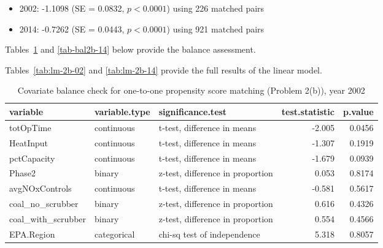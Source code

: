 \documentclass[11pt,letter]{article}
\begin{document}
\begin{enumerate}[(a)]
  \begin{itemize}
  \item 2002: -1.1098 (SE = 0.0832, $p < 0.0001$) using 226 matched
    pairs
  \item 2014: -0.7262 (SE = 0.0443, $p < 0.0001$) using 921 matched
    pairs
  \end{itemize}

  Tables~\ref{tab-bal2b-02} and \ref{tab-bal2b-14} below provide the
  balance assessment.

  Tables~\ref{tab:lm-2b-02} and \ref{tab:lm-2b-14} provide the full
  results of the linear model.

  \begin{table}[ht]
    \centering
    \begin{tabular}{lllrr}
      \toprule
      variable & variable.type & significance.test & test.statistic & p.value \\ 
      \midrule
      totOpTime & continuous & t-test, difference in means & -2.005 & 0.0456 \\ 
      HeatInput & continuous & t-test, difference in means & -1.307 & 0.1919 \\ 
      pctCapacity & continuous & t-test, difference in means & -1.679 & 0.0939 \\ 
      Phase2 & binary & z-test, difference in proportion & 0.053 & 0.8174 \\ 
      avgNOxControls & continuous & t-test, difference in means & -0.581 & 0.5617 \\ 
      coal\_no\_scrubber & binary & z-test, difference in proportion & 0.616 & 0.4326 \\ 
      coal\_with\_scrubber & binary & z-test, difference in proportion & 0.554 & 0.4566 \\ 
      EPA.Region & categorical & chi-sq test of independence & 5.318 & 0.8057 \\ 
      \bottomrule
    \end{tabular}
    \caption{Covariate balance check for one-to-one propensity score matching (Problem 2(b)), year 2002} 
    \label{tab-bal2b-02}
  \end{table}


\end{enumerate}
\end{document}
